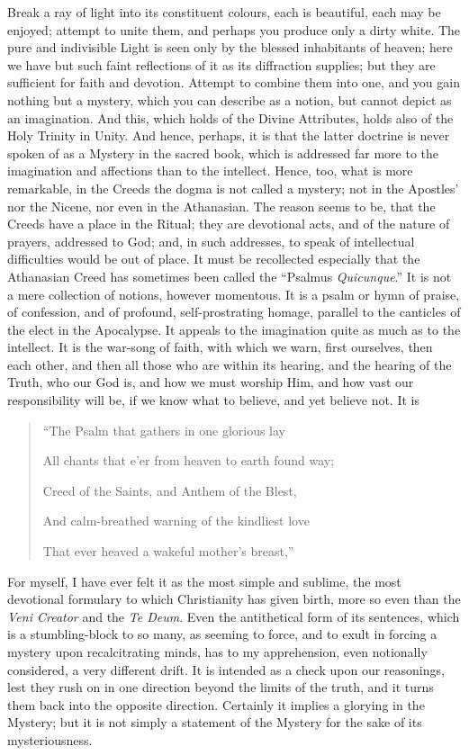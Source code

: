 Break a ray of light into its constituent colours, each is
beautiful, each may be enjoyed; attempt to unite them, and perhaps you
produce only a dirty white. The pure and indivisible Light is seen
only by the blessed inhabitants of heaven; here we have but such faint
reflections of it as its diffraction supplies; but they are sufficient
for faith and devotion. Attempt to combine them into one, and you gain
nothing but a mystery, which you can describe as a notion, but cannot
depict as an imagination. And this, which holds of the Divine
Attributes, holds also of the Holy Trinity in Unity. And hence,
perhaps, it is that the latter doctrine is never spoken of as a
Mystery in the sacred book, which is addressed far more to the
imagination and affections than to the intellect. Hence, too, what is
more remarkable, in the Creeds the dogma is not called a mystery; not
in the Apostles' nor the Nicene, nor even in the Athanasian. The
reason seems to be, that the Creeds have a place in the Ritual; they
are devotional acts, and of the nature of prayers, addressed to God;
and, in such addresses, to speak of intellectual difficulties
would be out of place. It must be recollected especially that the
Athanasian Creed has sometimes been called the ``Psalmus \emph{Quicunque}.''
It is not a mere collection of notions, however momentous. It is a
psalm or hymn of praise, of confession, and of profound,
self-prostrating homage, parallel to the canticles of the elect in the
Apocalypse. It appeals to the imagination quite as much as to the
intellect. It is the war-song of faith, with which we warn, first
ourselves, then each other, and then all those who are within its
hearing, and the hearing of the Truth, who our God is, and how we must
worship Him, and how vast our responsibility will be, if we know what
to believe, and yet believe not. It is

\begin{quote}

``The Psalm that gathers in one glorious lay

All chants that e'er from heaven to earth found way;

Creed of the Saints, and Anthem of the Blest,

And calm-breathed warning of the kindliest love

That ever heaved a wakeful mother's breast,''

\end{quote}

For myself, I have ever felt it as the most simple and sublime, the
most devotional formulary to which Christianity has given birth, more
so even than the \emph{Veni Creator} and the \emph{Te Deum}. Even the
antithetical form of its sentences, which is a stumbling-block to so
many, as seeming to force, and to exult in forcing a mystery upon
recalcitrating minds, has to my apprehension, even notionally
considered, a very different drift. It is intended as a check upon our
reasonings, lest they rush on in one direction beyond the limits of
the truth, and it turns them back into the opposite direction.
Certainly it implies a glorying in the Mystery; but it is not
simply a statement of the Mystery for the sake of its mysteriousness.

